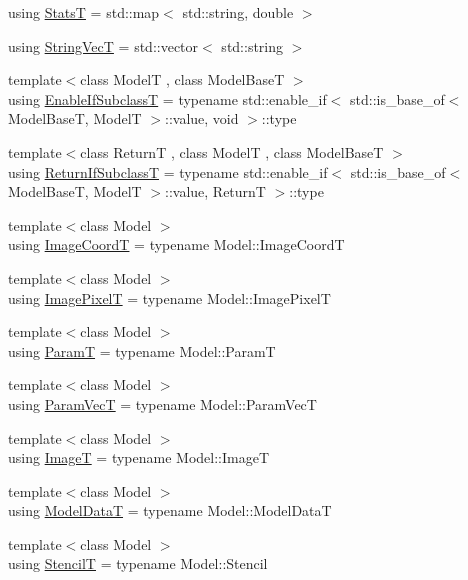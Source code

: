 \begin{DoxyCompactItemize}
using \hyperlink{namespacemappel_a04ab395b0cf82c4ce68a36b2212649a5}{StatsT} = std\+::map$<$ std\+::string, double $>$
\item 
using \hyperlink{namespacemappel_aae88cf18bccfbb789a6019bcfbbfca68}{String\+VecT} = std\+::vector$<$ std\+::string $>$
\item 
{\footnotesize template$<$class ModelT , class Model\+BaseT $>$ }\\using \hyperlink{namespacemappel_a5ee1448a35c267ee0bc4b8f1a2e09615}{Enable\+If\+SubclassT} = typename std\+::enable\+\_\+if$<$ std\+::is\+\_\+base\+\_\+of$<$ Model\+BaseT, ModelT $>$\+::value, void $>$\+::type
\item 
{\footnotesize template$<$class ReturnT , class ModelT , class Model\+BaseT $>$ }\\using \hyperlink{namespacemappel_a3b77d227658ba3ba9e16fea6fa6e626d}{Return\+If\+SubclassT} = typename std\+::enable\+\_\+if$<$ std\+::is\+\_\+base\+\_\+of$<$ Model\+BaseT, ModelT $>$\+::value, ReturnT $>$\+::type
\item 
{\footnotesize template$<$class Model $>$ }\\using \hyperlink{namespacemappel_a3ca6340183a2876d6bb6da936f1b667d}{Image\+CoordT} = typename Model\+::\+Image\+CoordT
\item 
{\footnotesize template$<$class Model $>$ }\\using \hyperlink{namespacemappel_a0b957a712590555ab00a1d0617a7f66f}{Image\+PixelT} = typename Model\+::\+Image\+PixelT
\item 
{\footnotesize template$<$class Model $>$ }\\using \hyperlink{namespacemappel_a667925cb0d6c0e49f2f035cc5a9a6857}{ParamT} = typename Model\+::\+ParamT
\item 
{\footnotesize template$<$class Model $>$ }\\using \hyperlink{namespacemappel_a0f86d3153e4e27b095012f140eea58de}{Param\+VecT} = typename Model\+::\+Param\+VecT
\item 
{\footnotesize template$<$class Model $>$ }\\using \hyperlink{namespacemappel_a14658186b77757f3c35a69cb1be6cf4b}{ImageT} = typename Model\+::\+ImageT
\item 
{\footnotesize template$<$class Model $>$ }\\using \hyperlink{namespacemappel_a97f050df953605381ae9c901c3b125f1}{Model\+DataT} = typename Model\+::\+Model\+DataT
\item 
{\footnotesize template$<$class Model $>$ }\\using \hyperlink{namespacemappel_a3a06598240007876f8c4bf834ad86197}{StencilT} = typename Model\+::\+Stencil

\end{DoxyCompactItemize}
